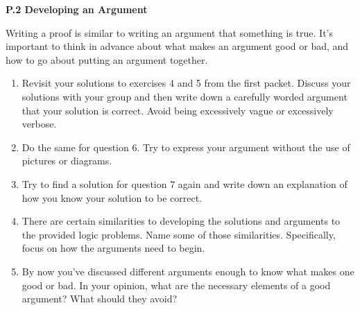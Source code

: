\documentclass[12 pt]{article}
\theoremstyle{definition}
\theoremstyle{plain}
\theoremstyle{mytheorem}
\theoremstyle{myexample}
\theoremstyle{mydefinition}
\begin{document}
\begin{center}
\textbf{P.2 Developing an Argument}
\end{center}

Writing a proof is similar to writing an argument that something is true.  It's important to think in advance about what makes an argument good or bad, and how to go about putting an argument together.

\begin{center}
\end{center}

\begin{enumerate}
\item Revisit your solutions to exercises 4 and 5 from the first packet.  Discuss your solutions with your group and then write down a carefully worded argument that your solution is correct.  Avoid being excessively vague or excessively verbose.

\newpage

\item Do the same for question 6.  Try to express your argument without the use of pictures or diagrams.  

\vspace{4in}

\item Try to find a solution for question 7 again and write down an explanation of how you know your solution to be correct.

\newpage

\item There are certain similarities to developing the solutions and arguments to the provided logic problems.  Name some of those similarities.  Specifically, focus on how the arguments need to begin.

\vspace{4in}

\item By now you've discussed different arguments enough to know what makes one good or bad.  In your opinion, what are the necessary elements of a good argument?  What should they avoid?
\end{enumerate}
\end{document}
